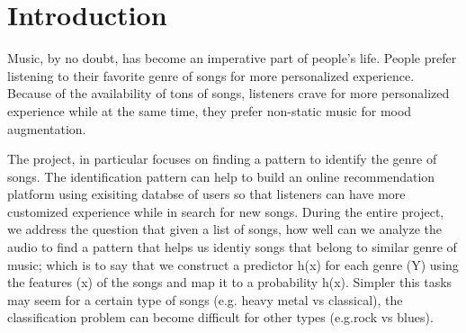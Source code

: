 \documentclass[journal]{IEEEtran}
\begin{document}
\section{Introduction}
Music, by no doubt, has become an imperative part of people's life. People prefer listening to their favorite genre of songs for more personalized experience. Because of the availability of tons of songs, listeners crave for more personalized experience while at the same time, they prefer non-static music for mood augmentation. \par
The project, in particular focuses on finding a pattern to identify the genre of songs. The identification pattern can help to build an online recommendation platform using exisiting databse of users so that listeners can have more customized experience while in search for new songs. During the entire project, we address the question that given a list of songs, how well can we analyze the audio to find a pattern that helps us identiy songs that belong to similar genre of music; which is to say that we construct a predictor h(x) for each genre (Y) using the features (x) of the songs and map it to a probability h(x). Simpler this tasks may seem for a certain type of songs (e.g. heavy metal vs classical), the classification problem can become difficult for other types (e.g.rock vs blues).

\end{document}
